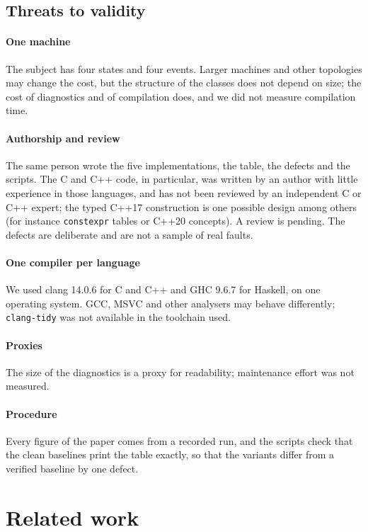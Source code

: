 \documentclass[review,12pt]{elsarticle}
\newcommand{\code}[1]{\texttt{#1}}
\begin{document}
\subsection{Threats to validity}
\label{sec:threats}

\paragraph{One machine} The subject has four states and four events. Larger machines and other topologies may change the cost, but the structure of the classes does not depend on size; the cost of diagnostics and of compilation does, and we did not measure compilation time.

\paragraph{Authorship and review} The same person wrote the five implementations, the table, the defects and the scripts. The C and C++ code, in particular, was written by an author with little experience in those languages, and has not been reviewed by an independent C or C++ expert; the typed C++17 construction is one possible design among others (for instance \code{constexpr} tables or C++20 concepts). A review is pending. The defects are deliberate and are not a sample of real faults.

\paragraph{One compiler per language} We used clang 14.0.6 for C and C++ and GHC 9.6.7 for Haskell, on one operating system. GCC, MSVC and other analysers may behave differently; \code{clang-tidy} was not available in the toolchain used.

\paragraph{Proxies} The size of the diagnostics is a proxy for readability; maintenance effort was not measured.

\paragraph{Procedure} Every figure of the paper comes from a recorded run, and the scripts check that the clean baselines print the table exactly, so that the variants differ from a verified baseline by one defect.

\section{Related work}
\label{sec:related}
\end{document}
